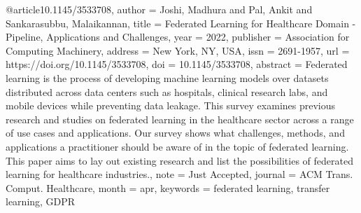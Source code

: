 @article{10.1145/3533708,
author = {Joshi, Madhura and Pal, Ankit and Sankarasubbu, Malaikannan},
title = {Federated Learning for Healthcare Domain - Pipeline, Applications and Challenges},
year = {2022},
publisher = {Association for Computing Machinery},
address = {New York, NY, USA},
issn = {2691-1957},
url = {https://doi.org/10.1145/3533708},
doi = {10.1145/3533708},
abstract = {Federated learning is the process of developing machine learning models over datasets distributed across data centers such as hospitals, clinical research labs, and mobile devices while preventing data leakage. This survey examines previous research and studies on federated learning in the healthcare sector across a range of use cases and applications. Our survey shows what challenges, methods, and applications a practitioner should be aware of in the topic of federated learning. This paper aims to lay out existing research and list the possibilities of federated learning for healthcare industries.},
note = {Just Accepted},
journal = {ACM Trans. Comput. Healthcare},
month = {apr},
keywords = {federated learning, transfer learning, GDPR}
}

